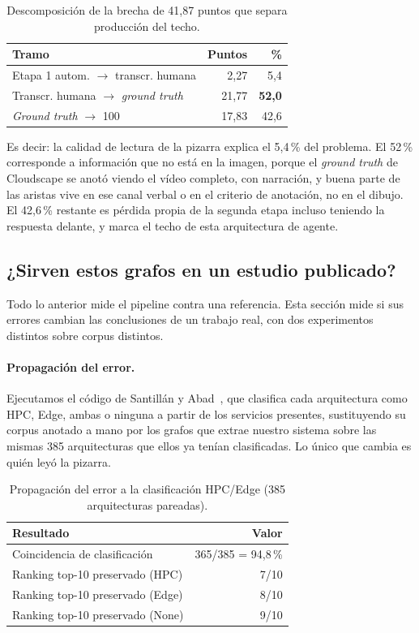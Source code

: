 \documentclass[a4paper, twocolumn, 10pt]{IEEEtran}
\begin{document}
\begin{table}[H]
\centering\small\setlength{\tabcolsep}{4pt}
\caption{Descomposición de la brecha de 41,87 puntos que separa producción del techo.}
\label{tab:tramos}
\begin{tabular}{lrr}
\toprule
Tramo & Puntos & \%\\
\midrule
Etapa 1 autom. $\rightarrow$ transcr. humana & 2,27 & 5,4\\
Transcr. humana $\rightarrow$ \emph{ground truth} & 21,77 & \textbf{52,0}\\
\emph{Ground truth} $\rightarrow$ 100 & 17,83 & 42,6\\
\bottomrule
\end{tabular}
\end{table}

Es decir: la calidad de lectura de la pizarra explica el 5,4\,\% del problema. El 52\,\% corresponde a información que no está en la imagen, porque el \emph{ground truth} de Cloudscape se anotó viendo el vídeo completo, con narración, y buena parte de las aristas vive en ese canal verbal o en el criterio de anotación, no en el dibujo. El 42,6\,\% restante es pérdida propia de la segunda etapa incluso teniendo la respuesta delante, y marca el techo de esta arquitectura de agente.

\subsection{¿Sirven estos grafos en un estudio publicado?}
\label{sec:downstream}

Todo lo anterior mide el pipeline contra una referencia. Esta sección
mide si sus errores cambian las conclusiones de un trabajo real, con dos
experimentos distintos sobre corpus distintos.

\paragraph{Propagación del error.} Ejecutamos el código de Santillán y
Abad~\cite{santillan2025hpc}, que clasifica cada arquitectura como
HPC, Edge, ambas o ninguna a partir de los servicios presentes,
sustituyendo su corpus anotado a mano por los grafos que extrae nuestro
sistema sobre las mismas 385 arquitecturas que ellos ya tenían
clasificadas. Lo único que cambia es quién leyó la pizarra.

\begin{table}[H]
\centering\small
\caption{Propagación del error a la clasificación HPC/Edge (385 arquitecturas pareadas).}
\label{tab:downstream}
\begin{tabular}{lr}
\toprule
Resultado & Valor\\
\midrule
Coincidencia de clasificación     & 365/385 = 94,8\,\%\\
Ranking top-10 preservado (HPC)   & 7/10\\
Ranking top-10 preservado (Edge)  & 8/10\\
Ranking top-10 preservado (None)  & 9/10\\
\bottomrule
\end{tabular}
\end{table}
\end{document}
